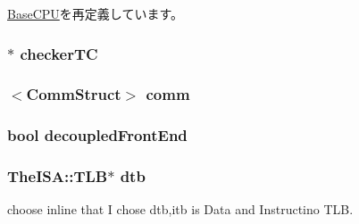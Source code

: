 \hyperlink{classBaseCPU_ad79de7771e2fdfe4aa9ba3d4f7e6972c}{BaseCPU}を再定義しています。\hypertarget{classOzoneCPU_ad1f4c9549fcd6bc1f9da3973e6abd4e5}{
\subsubsection[{checkerTC}]{$\ast$ {\bf checkerTC}}}
\label{classOzoneCPU_ad1f4c9549fcd6bc1f9da3973e6abd4e5}
\hypertarget{classOzoneCPU_a56544a9a5a169c4823c2adbb5e1d9e93}{
\subsubsection[{comm}]{$<${\bf CommStruct}$>$ {\bf comm}}}
\label{classOzoneCPU_a56544a9a5a169c4823c2adbb5e1d9e93}
\hypertarget{classOzoneCPU_a58989cf25fa8791be696b307e8ee430d}{
\subsubsection[{decoupledFrontEnd}]{\setlength{\rightskip}{0pt plus 5cm}bool {\bf decoupledFrontEnd}}}
\label{classOzoneCPU_a58989cf25fa8791be696b307e8ee430d}
\hypertarget{classOzoneCPU_ad2fd039621f87592c4b344d4f8948e78}{
\subsubsection[{dtb}]{\setlength{\rightskip}{0pt plus 5cm}TheISA::TLB$\ast$ {\bf dtb}}}
\label{classOzoneCPU_ad2fd039621f87592c4b344d4f8948e78}


choose inline that I chose dtb,itb is Data and Instructino TLB. 

